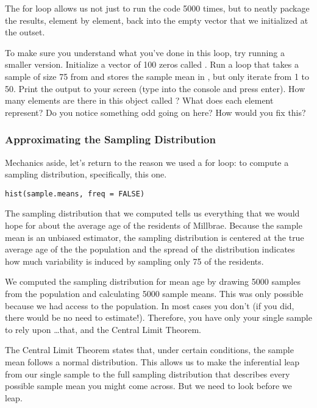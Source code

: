 \documentclass[11pt]{article}
\begin{document}
The for loop allows us not just to run the code 5000 times, but to neatly package the results, element by element, back into the empty vector that we initialized at the outset. 

\begin{exercise}
To make sure you understand what you've done in this loop, try running a smaller version.  Initialize a vector of 100 zeros called .  Run a loop that takes a sample of size 75 from  and stores the sample mean in , but only iterate from 1 to 50.  Print the output to your screen (type  into the console and press enter).  How many elements are there in this object called ? What does each element represent? Do you notice something odd going on here? How would you fix this?
\end{exercise}

\subsubsection*{Approximating the Sampling Distribution}
Mechanics aside, let's return to the reason we used a for loop: to compute a sampling distribution, specifically, this one.

\begin{lstlisting}
hist(sample.means, freq = FALSE)
\end{lstlisting}

The sampling distribution that we computed tells us everything that we would hope for about the average age of the residents of Millbrae.  Because the sample mean is an unbiased estimator, the sampling distribution is centered at the true average age of the the population and the spread of the distribution indicates how much variability is induced by sampling only 75 of the residents.

We computed the sampling distribution for mean age by drawing 5000 samples from the population and calculating 5000 sample means.  This was only possible because we had access to the population.  In most cases you don't (if you did, there would be no need to estimate!).  Therefore, you have only your single sample to rely upon \ldots that, and the Central Limit Theorem.

The Central Limit Theorem states that, under certain conditions, the sample mean follows a normal distribution.  This allows us to make the inferential leap from our single sample to the full sampling distribution that describes every possible sample mean you might come across.  But we need to look before we leap.
\end{document}
